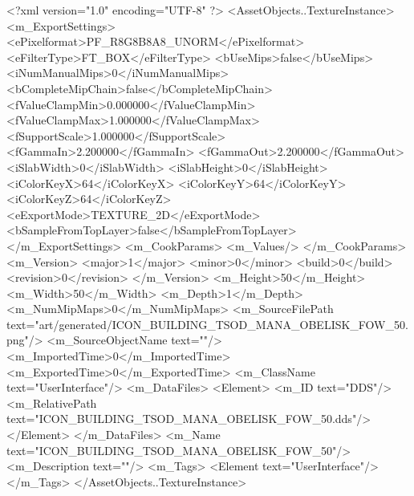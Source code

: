 <?xml version="1.0" encoding="UTF-8" ?>
<AssetObjects..TextureInstance>
	<m_ExportSettings>
		<ePixelformat>PF_R8G8B8A8_UNORM</ePixelformat>
		<eFilterType>FT_BOX</eFilterType>
		<bUseMips>false</bUseMips>
		<iNumManualMips>0</iNumManualMips>
		<bCompleteMipChain>false</bCompleteMipChain>
		<fValueClampMin>0.000000</fValueClampMin>
		<fValueClampMax>1.000000</fValueClampMax>
		<fSupportScale>1.000000</fSupportScale>
		<fGammaIn>2.200000</fGammaIn>
		<fGammaOut>2.200000</fGammaOut>
		<iSlabWidth>0</iSlabWidth>
		<iSlabHeight>0</iSlabHeight>
		<iColorKeyX>64</iColorKeyX>
		<iColorKeyY>64</iColorKeyY>
		<iColorKeyZ>64</iColorKeyZ>
		<eExportMode>TEXTURE_2D</eExportMode>
		<bSampleFromTopLayer>false</bSampleFromTopLayer>
	</m_ExportSettings>
	<m_CookParams>
		<m_Values/>
	</m_CookParams>
	<m_Version>
		<major>1</major>
		<minor>0</minor>
		<build>0</build>
		<revision>0</revision>
	</m_Version>
	<m_Height>50</m_Height>
	<m_Width>50</m_Width>
	<m_Depth>1</m_Depth>
	<m_NumMipMaps>0</m_NumMipMaps>
	<m_SourceFilePath text="art/generated/ICON_BUILDING_TSOD_MANA_OBELISK_FOW_50.png"/>
	<m_SourceObjectName text=""/>
	<m_ImportedTime>0</m_ImportedTime>
	<m_ExportedTime>0</m_ExportedTime>
	<m_ClassName text="UserInterface"/>
	<m_DataFiles>
		<Element>
			<m_ID text="DDS"/>
			<m_RelativePath text="ICON_BUILDING_TSOD_MANA_OBELISK_FOW_50.dds"/>
		</Element>
	</m_DataFiles>
	<m_Name text="ICON_BUILDING_TSOD_MANA_OBELISK_FOW_50"/>
	<m_Description text=""/>
	<m_Tags>
		<Element text="UserInterface"/>
	</m_Tags>
</AssetObjects..TextureInstance>
